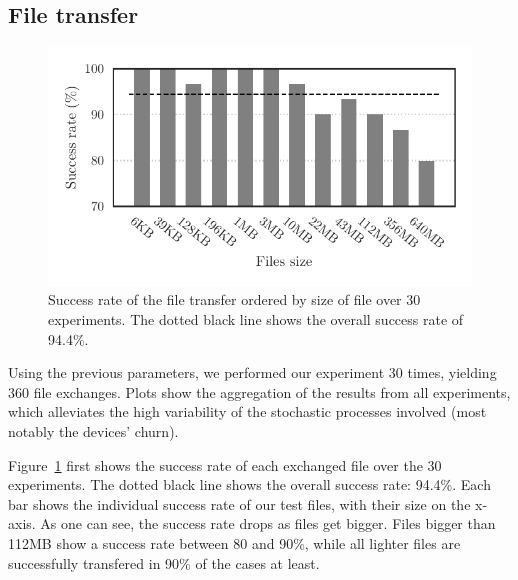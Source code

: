 
\subsection{File transfer}
\label{sub:file_transfer}

\begin{figure}[t]
  \centering
  \includegraphics[width=0.9\columnwidth]{figures/completion_vs_size.pdf}

  \caption{\label{fig:completion_vs_size}
  Success rate of the file transfer ordered by size of file over 30 experiments.
  The dotted black line shows the overall success rate of 94.4\%.}
\end{figure}


Using the previous parameters, we performed our experiment 30 times, yielding 360 file exchanges. Plots show the aggregation of the results from all experiments, which alleviates the high variability of the stochastic processes involved (most notably the devices' churn).

Figure~\ref{fig:completion_vs_size} first shows the success rate of each exchanged file over the 30 experiments.
The dotted black line shows the overall success rate: 94.4\%. 
Each bar shows the individual success rate of our test files, with their size on the x-axis.
As one can see, the success rate drops as files get bigger.
Files bigger than 112MB show a success rate between 80 and 90\%, while all lighter files are successfully transfered in 90\% of the cases at least.





